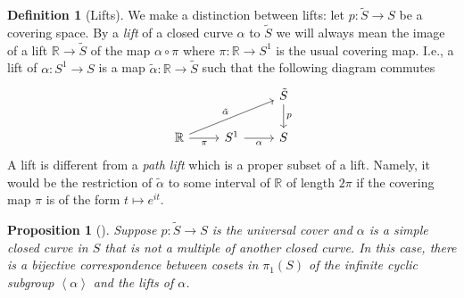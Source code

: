 \documentclass[reqno]{amsart}
\newtheorem{proposition}[theorem]{Proposition}
\theoremstyle{definition}
\newtheorem{definition}[theorem]{Definition}
\theoremstyle{remark}
\begin{document}
\begin{definition}[Lifts]
    We make a distinction between lifts: let $p \colon
    \tilde{S} \to S$ be a covering space. By a \textit{lift} of a closed
    curve $\alpha$ to $\tilde{S}$ we will always mean the image of
    a lift $\mathbb{R} \to \tilde{S}$ of the map
    $\alpha \circ \pi$ where $\pi \colon \mathbb{R} \to S^{1}$ is
    the usual covering map. I.e., a lift of $\alpha \colon
    S^{1} \to S$ is a map  $\tilde{\alpha} \colon \mathbb{R} \to 
    \tilde{S}$ such that the following diagram commutes
    \begin{equation*}
    \begin{tikzcd}
        & & \tilde{S} \ar[d, "p"]\\
        \mathbb{R} \ar[r, "\pi"'] \ar[rru, "\tilde{\alpha}"] & S^{1} \ar[r, 
        "\alpha"'] & S
    \end{tikzcd}
    \end{equation*}
    A lift is different from a \textit{path lift} which is
    a proper subset of a lift. Namely, it would be
    the restriction of $\tilde{\alpha}$ to some interval of
    $\mathbb{R}$ of length $2 \pi$ if the covering map
    $\pi$ is of the form $t \mapsto e^{it}$.
\end{definition}

\begin{proposition}[]
Suppose $p \colon \tilde{S} \to S$ is the universal cover
and $\alpha$ is a simple closed curve in $S$ that is
not a multiple of another closed curve. In this case, there
is a bijective correspondence
between cosets in $ \pi_1 (S)$
 of the infinite cyclic subgroup $\left<\alpha \right>$ and
 the lifts of $\alpha$.
\end{proposition}
\end{document}
